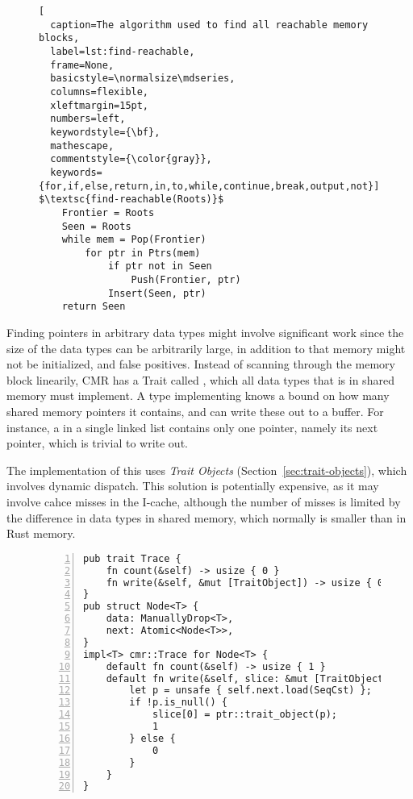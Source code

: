 \begin{figure}[ht]
\begin{lstlisting}[
  caption=The algorithm used to find all reachable memory blocks,
  label=lst:find-reachable,
  frame=None,
  basicstyle=\normalsize\mdseries,
  columns=flexible,
  xleftmargin=15pt,
  numbers=left,
  keywordstyle={\bf},
  mathescape,
  commentstyle={\color{gray}},
  keywords={for,if,else,return,in,to,while,continue,break,output,not}]
$\textsc{find-reachable(Roots)}$
    Frontier = Roots
    Seen = Roots
    while mem = Pop(Frontier)
        for ptr in Ptrs(mem)
            if ptr not in Seen
                Push(Frontier, ptr)
            Insert(Seen, ptr)
    return Seen
\end{lstlisting}
\end{figure}

Finding pointers in arbitrary data types might involve significant work since the size of the data
types can be arbitrarily large, in addition to that memory might not be initialized, and false
positives. Instead of scanning through the memory block linearily,  CMR has a Trait called , which all
data types that is in shared memory must implement.  A type implementing  knows a bound
on how many shared memory pointers it contains, and can write these out to a buffer. For instance,
a  in a single linked list contains only one pointer, namely its next pointer, which is
trivial to write out.

The implementation of this uses \emph{Trait Objects} (Section~\ref{sec:trait-objects}), which involves
dynamic dispatch. This solution is potentially expensive, as it may involve cahce misses in the
I-cache, although the number of misses is limited by the difference in data types in shared memory,
which normally is smaller than in Rust memory.

\begin{figure}[t]
  \begin{lstlisting}[caption=Definition of the \code{Trace} trait and a sample implementation for a
  linked list node. The impementation uses \emph{specialization} (Section~\ref{sec:specialization})
  as the implementation of \code{Node}s containing data that itself is \code{Trace} is different.,
  numbers=left,
  numberstyle=\color{gray}\ttfamily{}T,
  ]
pub trait Trace {
    fn count(&self) -> usize { 0 }
    fn write(&self, &mut [TraitObject]) -> usize { 0 }
}
pub struct Node<T> {
    data: ManuallyDrop<T>,
    next: Atomic<Node<T>>,
}
impl<T> cmr::Trace for Node<T> {
    default fn count(&self) -> usize { 1 }
    default fn write(&self, slice: &mut [TraitObject]) -> usize {
        let p = unsafe { self.next.load(SeqCst) };
        if !p.is_null() {
            slice[0] = ptr::trait_object(p);
            1
        } else {
            0
        }
    }
}\end{lstlisting}
\end{figure}

